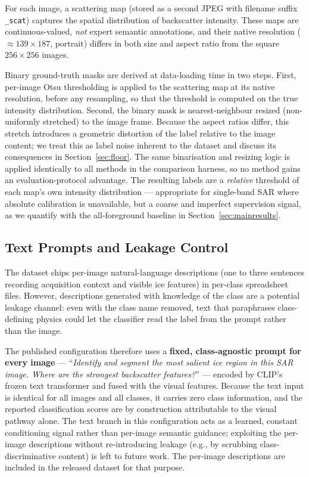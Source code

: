 \documentclass[remotesensing,article,accept,moreauthors,pdftex]{Definitions/mdpi}
\begin{document}
For each image, a scattering map (stored as a second JPEG with filename suffix
\texttt{\_scat}) captures the spatial distribution of backscatter intensity.
These maps are continuous-valued, \emph{not} expert semantic annotations, and
their native resolution ($\approx 139 \times 187$, portrait) differs in both
size and aspect ratio from the square $256 \times 256$ images.

Binary ground-truth masks are derived at data-loading time in two steps.
First, per-image Otsu thresholding \cite{otsu1979threshold} is applied to the
scattering map at its native resolution, before any resampling, so that the
threshold is computed on the true intensity distribution. Second, the binary
mask is nearest-neighbour resized (non-uniformly stretched) to the image frame.
Because the aspect ratios differ, this stretch introduces a geometric
distortion of the label relative to the image content; we treat this as label
noise inherent to the dataset and discuss its consequences in
Section~\ref{sec:floor}. The same binarisation and resizing logic is applied
identically to all methods in the comparison harness, so no method gains an
evaluation-protocol advantage. The resulting labels are a \emph{relative}
threshold of each map's own intensity distribution — appropriate for
single-band SAR where absolute calibration is unavailable, but a coarse and
imperfect supervision signal, as we quantify with the all-foreground baseline
in Section~\ref{sec:mainresults}.

\subsection{Text Prompts and Leakage Control}
\label{sec:textprompts}

The dataset ships per-image natural-language descriptions (one to three
sentences recording acquisition context and visible ice features) in per-class
spreadsheet files. However, descriptions generated with knowledge of the class
are a potential leakage channel: even with the class name removed, text that
paraphrases class-defining physics could let the classifier read the label
from the prompt rather than the image.

The published configuration therefore uses a \textbf{fixed, class-agnostic
prompt for every image} — ``\emph{Identify and segment the most salient ice
region in this SAR image. Where are the strongest backscatter features?}'' —
encoded by CLIP's frozen text transformer and fused with the visual features.
Because the text input is identical for all images and all classes, it carries
zero class information, and the reported classification scores are by
construction attributable to the visual pathway alone. The text branch in this
configuration acts as a learned, constant conditioning signal rather than
per-image semantic guidance; exploiting the per-image descriptions without
re-introducing leakage (e.g., by scrubbing class-discriminative content) is
left to future work. The per-image descriptions are included in the released
dataset for that purpose.
\end{document}

